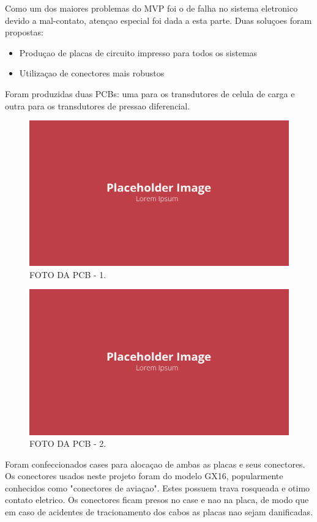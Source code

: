 Como um dos maiores problemas do MVP foi o de falha no sistema eletronico devido a mal-contato, atençao especial foi dada a esta parte. Duas soluçoes foram propostas:

\begin{itemize}
    \item Produçao de placas de circuito impresso para todos os sistemas
    \item Utilizaçao de conectores mais robustos
\end{itemize}

Foram produzidas duas PCBs: uma para os transdutores de celula de carga e outra para os transdutores de pressao diferencial.

\begin{figure}[!ht]
    \centering
    \includegraphics[width=.8\linewidth]{figuras/placeholder.png}
    \caption{FOTO DA PCB - 1\cite{autor}.}
    \label{fig:placeholder}
\end{figure}

\begin{figure}[!ht]
    \centering
    \includegraphics[width=.8\linewidth]{figuras/placeholder.png}
    \caption{FOTO DA PCB - 2\cite{autor}.}
    \label{fig:placeholder}
\end{figure}

Foram confeccionados cases para alocaçao de ambas as placas e seus conectores. Os conectores usados neste projeto foram do modelo GX16, popularmente conhecidos como "conectores de aviaçao". Estes possuem trava rosqueada e otimo contato eletrico. Os conectores ficam presos no case e nao na placa, de modo que em caso de acidentes de tracionamento dos cabos as placas nao sejam danificadas.

